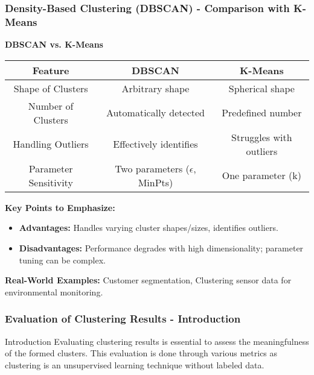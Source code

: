 \documentclass[aspectratio=169]{beamer}
\begin{document}
\begin{frame}[fragile]
    \frametitle{Density-Based Clustering (DBSCAN) - Comparison with K-Means}
    \textbf{DBSCAN vs. K-Means}
    \begin{center}
        \begin{tabular}{|c|c|c|}
            \hline
            \textbf{Feature} & \textbf{DBSCAN} & \textbf{K-Means} \\
            \hline
            Shape of Clusters & Arbitrary shape & Spherical shape \\
            \hline
            Number of Clusters & Automatically detected & Predefined number \\
            \hline
            Handling Outliers & Effectively identifies & Struggles with outliers \\
            \hline
            Parameter Sensitivity & Two parameters ($\epsilon$, MinPts) & One parameter (k) \\
            \hline
        \end{tabular}
    \end{center}

    \textbf{Key Points to Emphasize:}
    \begin{itemize}
        \item \textbf{Advantages:} Handles varying cluster shapes/sizes, identifies outliers.
        \item \textbf{Disadvantages:} Performance degrades with high dimensionality; parameter tuning can be complex.
    \end{itemize}
    
    \textbf{Real-World Examples:}
    Customer segmentation, Clustering sensor data for environmental monitoring.
\end{frame}

\begin{frame}[fragile]
    \frametitle{Evaluation of Clustering Results - Introduction}
    \begin{block}{Introduction}
        Evaluating clustering results is essential to assess the meaningfulness of the formed clusters. This evaluation is done through various metrics as clustering is an unsupervised learning technique without labeled data.
    \end{block}
\end{frame}
\end{document}
